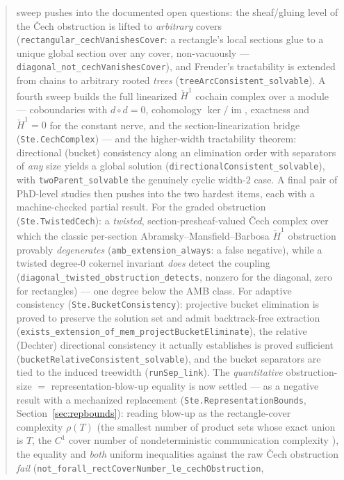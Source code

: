 \documentclass[11pt]{article}
\newcommand{\lean}[1]{\texttt{#1}}
\begin{document}
\begin{abstract}
sweep pushes into the documented open questions: the sheaf/gluing level
of the \v{C}ech obstruction is lifted to \emph{arbitrary} covers
(\lean{rectangular\_cechVanishesCover}: a rectangle's local sections
glue to a unique global section over any cover, non-vacuously ---
\lean{diagonal\_not\_cechVanishesCover}), and Freuder's tractability is
extended from chains to arbitrary rooted \emph{trees}
(\lean{treeArcConsistent\_solvable}).  A fourth sweep builds the full
linearized $\check{H}^1$ cochain complex over a module --- coboundaries
with $d \circ d = 0$, cohomology $\ker/\operatorname{im}$, exactness and
$\check{H}^1 = 0$ for the constant nerve, and the section-linearization
bridge (\lean{Ste.CechComplex}) --- and the higher-width tractability
theorem: directional (bucket) consistency along an elimination order
with separators of \emph{any} size yields a global solution
(\lean{directionalConsistent\_solvable}), with \lean{twoParent\_solvable}
the genuinely cyclic width-$2$ case.  A final pair of PhD-level studies
then pushes into the two hardest items, each with a machine-checked
partial result.  For the graded obstruction (\lean{Ste.TwistedCech}): a
\emph{twisted}, section-presheaf-valued \v{C}ech complex over which the
classic per-section Abramsky--Mansfield--Barbosa $\check{H}^1$ obstruction
provably \emph{degenerates} (\lean{amb\_extension\_always}: a false
negative), while a twisted degree-$0$ cokernel invariant \emph{does}
detect the coupling (\lean{diagonal\_twisted\_obstruction\_detects},
nonzero for the diagonal, zero for rectangles) --- one degree below the
AMB class.  For adaptive consistency (\lean{Ste.BucketConsistency}):
projective bucket elimination is proved to preserve the solution set and
admit backtrack-free extraction
(\lean{exists\_extension\_of\_mem\_projectBucketEliminate}), the relative
(Dechter) directional consistency it actually establishes is proved
sufficient (\lean{bucketRelativeConsistent\_solvable}), and the bucket
separators are tied to the induced treewidth (\lean{runSep\_link}).  The
\emph{quantitative} obstruction-size $=$ representation-blow-up equality
is now settled --- as a negative result with a mechanized replacement
(\lean{Ste.RepresentationBounds}, Section~\ref{sec:repbounds}): reading blow-up as the
rectangle-cover complexity $\rho(T)$ (the smallest number of product sets
whose exact union is $T$, the $C^1$ cover number of nondeterministic
communication complexity \citep{kushilevitz1997communication}), the
equality and \emph{both} uniform inequalities against the raw Čech
obstruction \emph{fail}
(\lean{not\_forall\_rectCoverNumber\_le\_cechObstruction},

\end{abstract}
\end{document}
